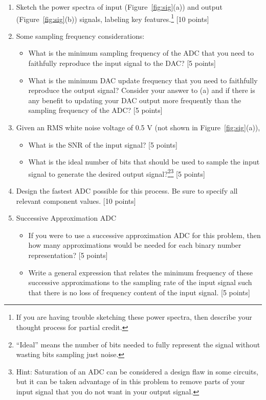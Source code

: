 \clearpage



\begin{enumerate}

\item Sketch the power spectra of input (Figure~\ref{fig:sig}(a)) and output
(Figure~\ref{fig:sig}(b)) signals, labeling key features.\footnote{If you are having
trouble sketching these power spectra, then describe your thought process for
partial credit.} [10 points]

\item Some sampling frequency considerations:
\begin{itemize}
    \item What is the minimum sampling frequency of the ADC that you need to
faithfully reproduce the input signal to the DAC?  [5 points]
    \item What is the minimum DAC update frequency that you need to faithfully
reproduce the output signal?  Consider your answer to (a) and if there is any
benefit to updating your DAC output more frequently than the sampling frequency
of the ADC? [5 points]
\end{itemize}

\item Given an RMS white noise voltage of 0.5 V (not shown in
Figure~\ref{fig:sig}(a)), 
\begin{itemize}
    \item What is the SNR of the input signal? [5 points]
    \item What is the ideal number of bits that should be used
to sample the input signal to generate the desired output
signal?\footnote{``Ideal'' means the number of bits needed to fully represent
the signal without wasting bits sampling just noise.}\footnote{Hint: Saturation
of an ADC can be considered a design flaw in some circuits, but it can be taken
advantage of in this problem to remove parts of your input signal that you do
not want in your output signal.} [5 points]
\end{itemize}

\item Design the fastest ADC possible for this process.  Be sure to specify all
relevant component values. [10 points]

\item Successive Approximation ADC
\begin{itemize}
    \item If you were to use a successive approximation ADC for this problem, then
how many approximations would be needed for each binary number representation?  [5 points]
    \item Write a general expression that relates the minimum frequency of these
successive approximations to the sampling rate of the input signal such that there is no
loss of frequency content of the input signal. [5 points]
\end{itemize}


\end{enumerate}
